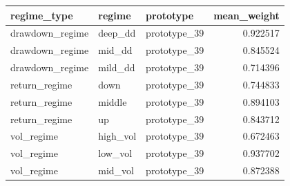 \begin{tabular}{lllr}
\toprule
regime\_type & regime & prototype & mean\_weight \\
\midrule
drawdown\_regime & deep\_dd & prototype\_39 & 0.922517 \\
drawdown\_regime & mid\_dd & prototype\_39 & 0.845524 \\
drawdown\_regime & mild\_dd & prototype\_39 & 0.714396 \\
return\_regime & down & prototype\_39 & 0.744833 \\
return\_regime & middle & prototype\_39 & 0.894103 \\
return\_regime & up & prototype\_39 & 0.843712 \\
vol\_regime & high\_vol & prototype\_39 & 0.672463 \\
vol\_regime & low\_vol & prototype\_39 & 0.937702 \\
vol\_regime & mid\_vol & prototype\_39 & 0.872388 \\
\bottomrule
\end{tabular}
